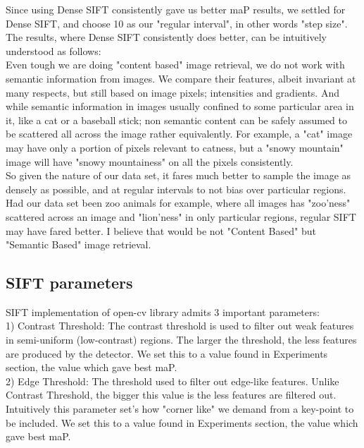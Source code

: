 \documentclass[conference,compsoc]{IEEEtran}
\begin{document}
Since using Dense SIFT consistently gave us better maP results, we settled for Dense SIFT, and choose 10 as our "regular interval", in other words "step size". \\

The results, where Dense SIFT consistently does better, can be intuitively understood as follows: \\

Even tough we are doing "content based" image retrieval, we do not work with semantic information from images. We compare their features, albeit invariant at many respects, but still based on image pixels; intensities and gradients. And while semantic information in images usually confined to some particular area in it, like a cat or a baseball stick; non semantic content can be safely assumed to be scattered all across the image rather equivalently. For example, a "cat" image may have only a portion of pixels relevant to catness, but a "snowy mountain" image will have "snowy mountainess" on all the pixels consistently. \\

So given the nature of our data set, it fares much better to sample the image as densely as possible, and at regular intervals to not bias over particular regions. Had our data set been zoo animals for example, where all images has "zoo'ness" scattered across an image and "lion'ness" in only particular regions, regular SIFT may have fared better. I believe that would be not "Content Based" but "Semantic Based" image retrieval.

\subsection{SIFT parameters}

SIFT implementation of open-cv library admits 3 important parameters: \\

1) Contrast Threshold: The contrast threshold is used to filter out weak features in semi-uniform (low-contrast) regions. The larger the threshold, the less features are produced by the detector. We set this to a value found in Experiments section, the value which gave best maP. \\

2) Edge Threshold: 	The threshold used to filter out edge-like features. Unlike Contrast Threshold, the bigger this value is the less features are filtered out. Intuitively this parameter set's how "corner like" we demand from a key-point to be included. We set this to a value found in Experiments section, the value which gave best maP.\\
\end{document}
